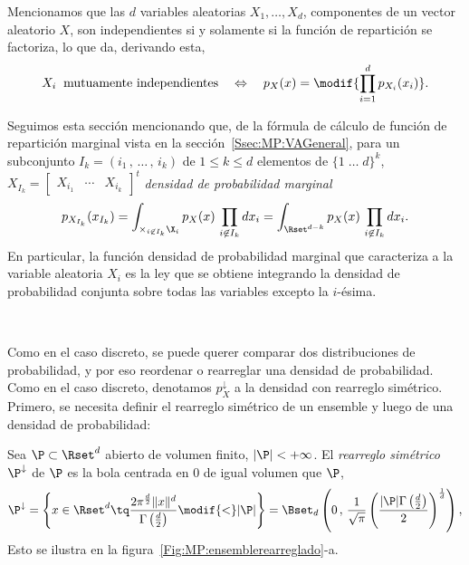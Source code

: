 Mencionamos que las $d$ variables  aleatorias $X_1, \ldots, X_d$, componentes de
un vector  aleatorio $X$, son independientes  si y solamente si  la funci\'on de
repartici\'on se factoriza, lo que da, derivando esta,
%
\[
X_i \:  \mbox{ mutuamente independientes} \quad \Leftrightarrow  \quad p_X(x) =
\modif{\prod_{i=1}^d p_{X_i}(x_i)}.
\]


Seguimos  esta  secci\'on mencionando  que,  de  la  f\'ormula de  c\'alculo  de
funci\'on       de      repartici\'on       marginal      vista       en      la
secci\'on~\ref{Ssec:MP:VAGeneral},  para un  subconjunto  $I_k =  (i_1  \, ,  \,
\ldots \, , \, i_k)$ de $1 \le k \le d$ elementos de $\{ 1 \; \ldots \; d \}^k$,
$X_{I_k}   =  \begin{bmatrix}   X_{i_1}  &   \cdots   &  X_{i_k}\end{bmatrix}^t$
 {\it densidad de probabilidad marginal}
%
\[
p_{X_{I_k}}(x_{I_k})  = \int_{\times_{i  \not\in  I_k} \X_i}  p_X(x) \,  \prod_{i
    \not\in I_k}  dx_i =  \int_{\Rset^{d-k}} p_X(x) \,  \prod_{i \not\in
      I_k} dx_i.
\]
%
En particular, la funci\'on densidad  de probabilidad marginal que caracteriza a
la variable aleatoria  $X_i$ es la ley que se obtiene  integrando la densidad de
probabilidad conjunta sobre todas las variables excepto la $i$-\'esima.

\

Como  en  el caso  discreto,  se puede  querer  comparar  dos distribuciones  de
probabilidad, y  por eso  reordenar o rearreglar  una densidad  de probabilidad.
Como en el caso discreto, denotamos $p_X^\downarrow$ a la densidad con rearreglo
sim\'etrico.   Primero,  se necesita  definir  el  rearreglo  sim\'etrico de  un
ensemble y luego de una densidad de probabilidad:
%
\begin{definicion}
\label{Def:MP:RearregloConjunto}
%
  Sea $\P \subset \Rset^d$ abierto de  volumen finito, $|\P| < +\infty$.  El {\it
    rearreglo sim\'etrico} $\P^\downarrow$  de $\P$ es la bola  centrada en 0 de
 igual volumen que $\P$, \ie
  \[
  \P^\downarrow  =   \left\{  x   \in  \Rset^d  \tq   \frac{2  \pi^{\frac{d}{2}}
      \|x\|^d}{\Gamma\left(\frac{d}{2}\right)} \modif{<} |\P| \right\} = \Bset_d\left(
    0  \,  , \,  \frac1{\sqrt{\pi}}  \left(  \frac{|\P| \Gamma\left(  \frac{d}{2}
        \right)}{2} \right)^{\frac1d} \right),
  \]
  Esto se ilustra en la figura~\ref{Fig:MP:ensemblerearreglado}-a.
\end{definicion}


